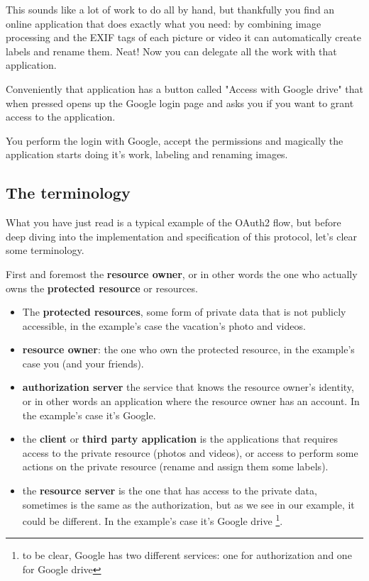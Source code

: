 This sounds like a lot of work to do all by hand, but thankfully you find an
online application that does exactly what you need: by combining image
processing and the EXIF tags of each picture or video it can automatically
create labels and rename them. Neat! Now you can delegate all the work with that
application.

Conveniently that application has a button called "Access with Google drive"
that when pressed opens up the Google login page and asks you if you want to
grant access to the application.

You perform the login with Google, accept the permissions and magically the
application starts doing it's work, labeling and renaming images.

\subsection{The terminology}
What you have just read is a typical example of the OAuth2 flow, but before deep
diving into the implementation and specification of this protocol, let's clear
some terminology.

First and foremost the \textbf{resource owner}, or in other words the one who
actually owns the \textbf{protected resource} or resources.

\begin{itemize}
    \item The \textbf{protected resources}, some form of private data that is
        not publicly accessible, in the example's case the vacation's photo and
        videos.
    \item \textbf{resource owner}: the one who own the protected resource, in
        the example's case you (and your friends).
    \item \textbf{authorization server} the service that knows the resource
        owner's identity, or in other words an application where the resource
        owner has an account. In the example's case it's Google.
    \item the \textbf{client} or \textbf{third party application} is the
        applications that requires access to the private resource (photos and
        videos), or access to perform some actions on the private resource
        (rename and assign them some labels).
    \item the \textbf{resource server} is the one that has access to the private
        data, sometimes is the same as the authorization, but as we see in our
        example, it could be different.
        In the example's case it's Google drive \footnote{to be clear, Google
        has two different services: one for authorization and one for Google
        drive}.
\end{itemize}

